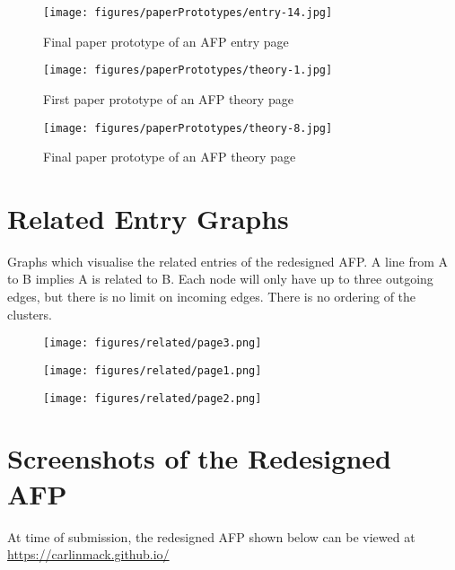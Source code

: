 \documentclass[bsc,frontabs,oneside,singlespacing,parskip,deptreport,logo]{infthesis}
\begin{document}
\begin{figure}[h]
    \centering
    \texttt{[image: figures/paperPrototypes/entry-14.jpg]}
    \caption{Final paper prototype of an AFP entry page}
    \label{paper-entry}
\end{figure}

\begin{figure}[h]
    \centering
    \texttt{[image: figures/paperPrototypes/theory-1.jpg]}
    \caption{First paper prototype of an AFP theory page}

\end{figure}

\begin{figure}[h]
    \centering
    \texttt{[image: figures/paperPrototypes/theory-8.jpg]}
    \caption{Final paper prototype of an AFP theory page}

\end{figure}

\chapter{Related Entry Graphs} \label{relatedEntryGraphs}

Graphs which visualise the related entries of the redesigned AFP. A line from A to B implies A is related to B. Each node will only have up to three outgoing edges, but there is no limit on incoming edges. There is no ordering of the clusters.

\begin{figure}[h]
    \centering
    \texttt{[image: figures/related/page3.png]}
\end{figure}

\begin{figure}[h]
    \centering
    \texttt{[image: figures/related/page1.png]}
\end{figure}

\begin{figure}[h]
    \centering
    \texttt{[image: figures/related/page2.png]}
\end{figure}

\chapter{Screenshots of the Redesigned AFP}

At time of submission, the redesigned AFP shown below can be viewed at \url{https://carlinmack.github.io/}
\end{document}
